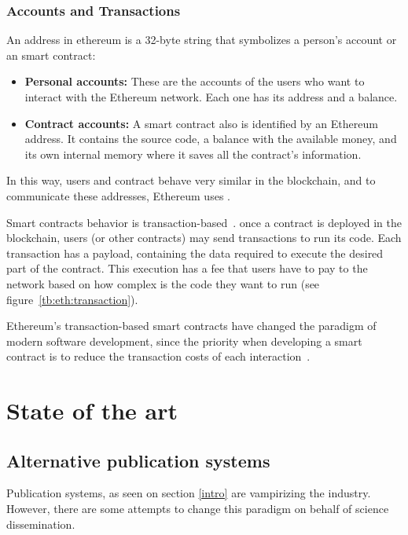 \subsubsection*{Accounts and Transactions}
\label{ts:at}
An address in ethereum is a 32-byte string that symbolizes a person's account or
an smart contract:
\begin{itemize}
\item \textbf{Personal accounts:} These are the accounts of the users who want
  to interact with the Ethereum network. Each one has its address and a balance.
\item \textbf{Contract accounts:} A smart contract also is identified by an
  Ethereum address. It contains the source code, a balance with the available
  money, and its own internal memory where it saves all the contract's
  information.
\end{itemize}

In this way, users and contract behave very similar in the blockchain, and to
communicate these addresses, Ethereum uses .


Smart contracts behavior is transaction-based~\cite{wood2014ethereum}. once a
contract is deployed in the blockchain, users (or other contracts) may send
transactions to run its code. Each transaction has a payload, containing the
data required to execute the desired part of the contract. This execution has a
fee that users have to pay to the network based on how complex is the code they
want to run (see figure~\ref{tb:eth:transaction}).

Ethereum's transaction-based smart contracts have changed the paradigm of modern
software development, since the priority when developing a smart contract is to
reduce the transaction costs of each interaction~\cite{delmolino2016step}.


\section{State of the art}
\subsection{Alternative publication systems}
\label{soa:aps}
Publication systems, as seen on section \ref{intro} are vampirizing the
industry. However, there are some attempts to change this paradigm on behalf of
science dissemination.

